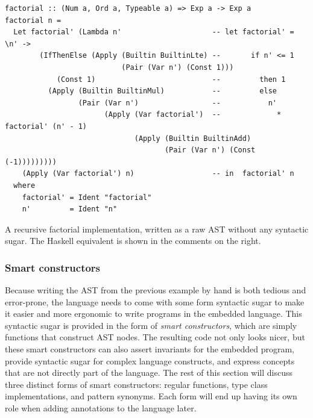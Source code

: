 \documentclass[fontsize=11pt,a4paper,parskip=half,numbers=noenddot]{scrartcl}
\begin{document}
\begin{listing}[!ht]
\begin{verbatim}
factorial :: (Num a, Ord a, Typeable a) => Exp a -> Exp a
factorial n =
  Let factorial' (Lambda n'                     -- let factorial' = \n' ->
        (IfThenElse (Apply (Builtin BuiltinLte) --       if n' <= 1
                           (Pair (Var n') (Const 1)))
            (Const 1)                           --         then 1
          (Apply (Builtin BuiltinMul)           --         else
                 (Pair (Var n')                 --           n'
                       (Apply (Var factorial')  --             * factorial' (n' - 1)
                              (Apply (Builtin BuiltinAdd)
                                     (Pair (Var n') (Const (-1)))))))))
    (Apply (Var factorial') n)                  -- in  factorial' n
  where
    factorial' = Ident "factorial"
    n'         = Ident "n"
\end{verbatim}
\caption{A recursive factorial implementation, written as a raw AST without any syntactic sugar. The Haskell equivalent is shown in the comments on the right.}\label{src:base-raw-factorial}
\end{listing}

\subsubsection{Smart constructors}\label{sec:language-smart-constructors}


Because writing the AST from the previous example by hand is both tedious and
error-prone, the language needs to come with some form syntactic sugar to make
it easier and more ergonomic to write programs in the embedded language. This
syntactic sugar is provided in the form of \emph{smart constructors}, which are
simply functions that construct AST nodes. The resulting code not only looks
nicer, but these smart constructors can also assert invariants for the embedded
program, provide syntactic sugar for complex language constructs, and express
concepts that are not directly part of the language. The rest of this section
will discuss three distinct forms of smart constructors: regular functions, type
class implementations, and pattern synonyms. Each form will end up having its
own role when adding annotations to the language later.
\end{document}
